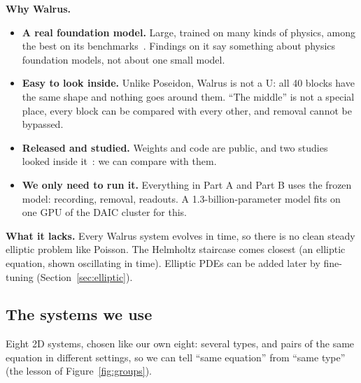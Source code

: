 \documentclass[11pt,a4paper]{article}
\begin{document}
\textbf{Why Walrus.}
\begin{itemize}[itemsep=0.6em]
  \item \textbf{A real foundation model.} Large, trained on many kinds of physics, among the best on its benchmarks~\cite{walrus}.
  Findings on it say something about physics foundation models, not about one small model.
  \item \textbf{Easy to look inside.} Unlike Poseidon, Walrus is not a U: all 40 blocks have the same shape and nothing goes around them.
  ``The middle'' is not a special place, every block can be compared with every other, and removal cannot be bypassed.
  \item \textbf{Released and studied.} Weights and code are public, and two studies looked inside it~\cite{fear2025, rosenfeld2026}:
  we can compare with them.
  \item \textbf{We only need to run it.} Everything in Part A and Part B uses the frozen model: recording, removal, readouts.
  A 1.3-billion-parameter model fits on one GPU of the DAIC cluster for this.
\end{itemize}

\textbf{What it lacks.} Every Walrus system evolves in time, so there is no clean steady elliptic problem like Poisson.
The Helmholtz staircase comes closest (an elliptic equation, shown oscillating in time). Elliptic PDEs can be added later
by fine-tuning (Section~\ref{sec:elliptic}).

\subsection{The systems we use}

Eight 2D systems, chosen like our own eight: several types, and pairs of the same equation in different settings,
so we can tell ``same equation'' from ``same type'' (the lesson of Figure~\ref{fig:groups}).
\end{document}
